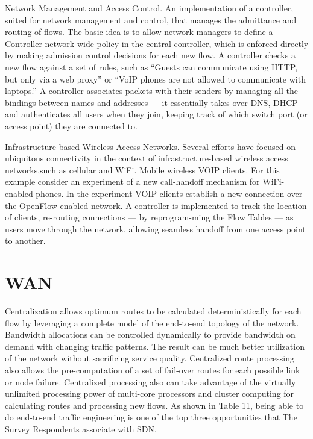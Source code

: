 Network Management and Access Control. An implementation of a controller, suited for network management and control, that manages the admittance and routing of flows. The basic idea is to allow network managers to define a Controller network-wide policy in the central controller, which is enforced directly by making admission control decisions for each new flow. A controller checks a new flow against a set of rules, such as “Guests can communicate using HTTP, but only via a web proxy” or “VoIP phones are not allowed to communicate with laptops.” A controller associates packets with their senders by managing all the bindings between names and addresses — it essentially takes over DNS, DHCP and authenticates all users when they join, keeping track of which switch port (or access point) they are connected to. \cite{OpenFlowStanfordUsing}

Infrastructure-based Wireless Access Networks. Several efforts have focused on ubiquitous connectivity in the context of infrastructure-based wireless access networks,such as cellular and WiFi.
Mobile wireless VOIP clients. For this example consider an experiment of a new call-handoff mechanism for WiFi-enabled phones. In the experiment VOIP clients establish a new connection over the OpenFlow-enabled network. A controller is implemented to track the
location of clients, re-routing connections — by reprogram-ming the Flow Tables — as users move through the network, allowing seamless handoff from one access point to another. \cite{OpenFlowStanfordUsing}


\section{WAN}
Centralization allows optimum routes to be calculated deterministically for each flow by leveraging a complete model of the end-to-end topology of the network. Bandwidth allocations can be controlled dynamically to provide bandwidth on demand with changing traffic patterns. The result can be much better utilization of the network without sacrificing service quality. Centralized route processing also allows the pre-computation of a set of fail-over routes for each possible link or node failure. Centralized processing also can take advantage of the virtually unlimited processing power of multi-core processors and cluster computing for calculating routes and processing new flows. As shown in Table 11, being able to do end-to-end traffic engineering is one of the top three opportunities that The Survey Respondents associate with SDN.


